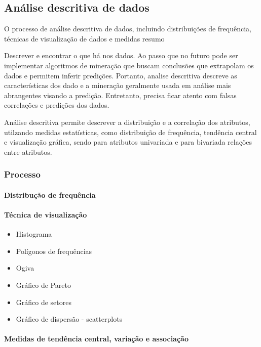 \subsection{Análise descritiva de dados}

O processo de análise descritiva de dados, incluindo distribuições de frequência, técnicas de visualização de dados e medidas resumo

Descrever e encontrar o que há nos dados.
Ao passo que no futuro pode ser implementar algoritmos de mineração que buscam conclusões que extrapolam os dados e permitem inferir predições.
Portanto, analise descritiva descreve as características dos dado e a mineração geralmente usada em análise mais abrangentes visando a predição.
Entretanto, precisa ficar atento com falsas correlações e predições dos dados.

Análise descritiva permite descrever a distribuição e a correlação dos atributos, utilzando medidas estatísticas, como distribuição de frequência, tendência central e visualização gráfica, sendo para atributos univariada e para bivariada relações entre atributos.

\subsubsection*{Processo}

\paragraph*{Distribução de frequência}

\paragraph*{Técnica de visualização}
\begin{itemize}
    \item Histograma
    \item Polígonos de frequências
    \item Ogiva
    \item Gráfico de Pareto
    \item Gráfico de setores
    \item Gráfico de dispersão - scatterplots
\end{itemize}

\paragraph*{Medidas de tendência central, variação e associação}


